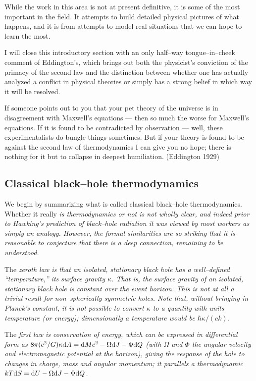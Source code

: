 While the work in this area is not at present definitive, it is some of the
most important in the field.  It attempts to build detailed physical pictures
of what happens, and it is from attempts to model real situations that we can
hope to learn the most.

I will close this introductory section with an only half--way tongue--in--cheek
comment of Eddington's, which brings out both the physicist's conviction of the
primacy of the second law
and the distinction between whether one has actually analyzed a
conflict in physical theories or simply has a strong belief in which way it
will be resolved.

\itemitem{}
If someone points out to you that your pet theory of the universe is in
disagreement with Maxwell's equations --- then so much the worse for Maxwell's
equations.  If it is found to be contradicted by observation --- well, these
experimentalists do bungle things sometimes.
But if your theory is found to be against the second law of thermodynamics I
can give you no hope; there is nothing for it but to collapse in deepest
humiliation.  (Eddington 1929)

\subsection{Classical black--hole thermodynamics}

We begin by summarizing what is called classical black--hole thermodynamics.  
Whether it really \it is \rm thermodynamics or not is not wholly clear, and
indeed prior to Hawking's prediction of black--hole radiation it was viewed by
most workers as simply an analogy. However, the formal similarities are so
striking that it is reasonable to conjecture that there is a deep connection,
remaining to be understood.

The \it zeroth law \rm is that an isolated, stationary black hole has a
well--defined ``temperature,'' its surface gravity $\kappa$.  That is, the
surface gravity of an isolated, stationary black hole is constant over the
event horizon.  This is not at all a trivial result for non--spherically
symmetric  holes.  Note that, without bringing in Planck's constant, it is not
possible to convert $\kappa$ to a quantity with units temperature (or energy);
dimensionally a temperature would be $\hbar \kappa /(ck)$.

The \it first law \rm is conservation of energy, which can be expressed in
differential form as $8\pi (c^2/G)\kappa\d A=\d Mc^2-\Omega \d J-\Phi \d Q$
(with $\Omega$ and $\Phi$ the angular velocity and electromagnetic potential at
the horizon), giving the response of the hole to changes in charge, mass and
angular momentum; it parallels a thermodynamic $kT\d S=\d U -\Omega \d J-\Phi
\d Q$.

